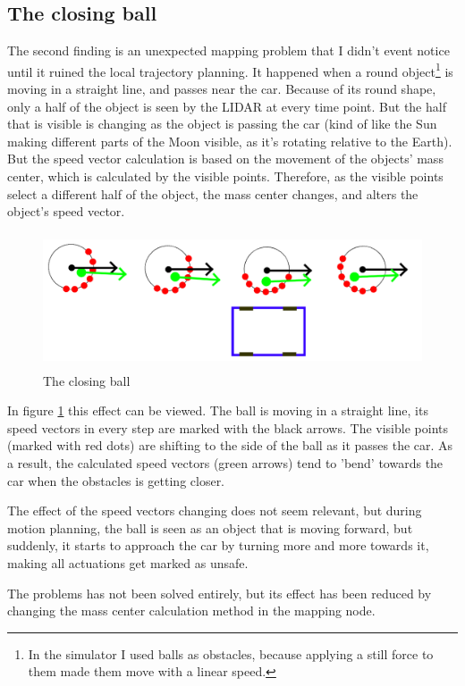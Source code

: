 \subsection{The closing ball}
\label{chap:closing_ball}
The second finding is an unexpected mapping problem that I didn't event notice until it ruined the local trajectory planning. It happened when a round object\footnote{In the simulator I used balls as obstacles, because applying a still force to them made them move with a linear speed.} is moving in a straight line, and passes near the car. Because of its round shape, only a half of the object is seen by the LIDAR at every time point. But the half that is visible is changing as the object is passing the car (kind of like the Sun making different parts of the Moon visible, as it's rotating relative to the Earth). But the speed vector calculation is based on the movement of the objects' mass center, which is calculated by the visible points. Therefore, as the visible points select a different half of the object, the mass center changes, and alters the object's speed vector.

\begin{figure}[!ht]
	\centering
	\includegraphics[height=40mm]{figures/raw/closing_ball.png}
	\caption{The closing ball}
	\label{closing_ball}
\end{figure} 

In figure \ref{closing_ball} this effect can be viewed. The ball is moving in a straight line, its speed vectors in every step are marked with the black arrows. The visible points (marked with red dots) are shifting to the side of the ball as it passes the car. As a result, the calculated speed vectors (green arrows) tend to 'bend' towards the car when the obstacles is getting closer.

The effect of the speed vectors changing does not seem relevant, but during motion planning, the ball is seen as an object that is moving forward, but suddenly, it starts to approach the car by turning more and more towards it, making all actuations get marked as unsafe.

The problems has not been solved entirely, but its effect has been reduced by changing the mass center calculation method in the mapping node.